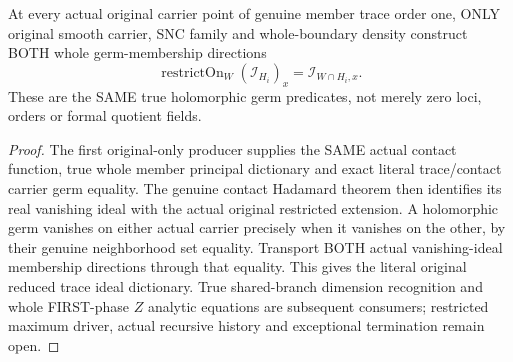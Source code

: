 \begin{theorem}
\label{hir:sharp-original-order-one-member-actual-reduced-relative-ideal}
\leanok
At every actual original carrier point of genuine member trace order one,
ONLY original smooth carrier, SNC family and whole-boundary density construct
BOTH whole germ-membership directions
\[
 \operatorname{restrictOn}_W(\mathcal I_{H_i})_x
       =\mathcal I_{W\cap H_i,x}.
\]
These are the SAME true holomorphic germ predicates, not merely zero loci,
orders or formal quotient fields.
\end{theorem}
\begin{proof}
The first original-only producer supplies the SAME actual contact function,
true whole member principal dictionary and exact literal trace/contact carrier
germ equality. The genuine contact Hadamard theorem then identifies its real
vanishing ideal with the actual original restricted extension. A holomorphic
germ vanishes on either actual carrier precisely when it vanishes on the other,
by their genuine neighborhood set equality. Transport BOTH actual
vanishing-ideal membership directions through that equality. This gives the
literal original reduced trace ideal dictionary. True shared-branch dimension
recognition and whole FIRST-phase $Z$ analytic equations are subsequent consumers;
restricted maximum driver, actual recursive history and exceptional termination
remain open.
\end{proof}
